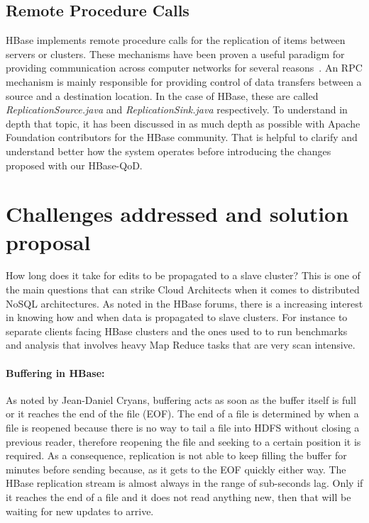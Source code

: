 \subsection{Remote Procedure Calls}
HBase implements remote procedure calls for the replication of items between servers or clusters. These mechanisms have been proven a useful paradigm for providing communication across computer networks for several reasons~\cite{Birrell:1984}. An RPC mechanism is mainly responsible for providing control of data transfers between a source and a destination location. In the case of HBase, these are called \emph{ReplicationSource.java} and \emph{ReplicationSink.java} respectively. To understand in depth that topic, it has been discussed in as much depth as possible with Apache Foundation contributors for the HBase community. That is helpful to clarify and understand better how the system operates before introducing the changes proposed with our HBase-QoD.

\section{Challenges addressed and solution proposal}
How long does it take for edits to be propagated to a slave cluster? This is one of the main questions that can strike Cloud Architects when it comes to distributed NoSQL architectures. As noted in the HBase forums, there is a increasing interest in knowing how and when data is propagated to slave clusters. For instance to separate clients facing HBase clusters and the ones used to to run benchmarks and analysis that involves heavy Map Reduce tasks that are very scan intensive.

\paragraph*{Buffering in HBase:}
As noted by Jean-Daniel Cryans, buffering acts as soon as the buffer itself is full or it reaches the end of the file (EOF). The end of a file is determined by when a file is reopened because there is no way to tail a file into HDFS without closing a previous reader, therefore reopening the file and seeking to a certain position it is required. As a consequence, replication is not able to keep filling the buffer for minutes before sending because, as it gets to the EOF quickly either way. The HBase replication stream is almost always in the range of sub-seconds lag. Only if it reaches the end of a file and it does not read anything new, then that will be waiting for new updates to arrive.

